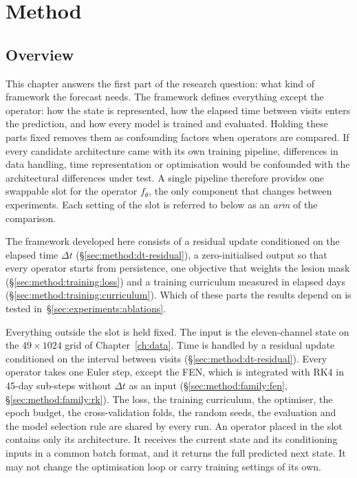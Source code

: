\cleardoubleoddpage%
\chapter{Method}
\label{ch:method}


\section{Overview}
\label{sec:method:overview}

This chapter answers the first part of the research question: what kind
of framework the forecast needs. The framework defines everything except
the operator: how the state is represented, how the elapsed time
between visits enters the prediction, and how every model is trained and
evaluated. Holding these parts fixed removes them as confounding factors
when operators are compared. If every candidate architecture came with its
own training pipeline, differences in data handling, time representation
or optimisation would be confounded with the architectural differences
under test. A single pipeline therefore provides one swappable slot for
the operator $f_\theta$, the only component that changes between
experiments. Each setting of the slot is referred to below as an
\emph{arm} of the comparison.

The framework developed here consists of a residual update conditioned
on the elapsed time $\Delta t$ (\S\ref{sec:method:dt-residual}), a
zero-initialised output so that every operator starts from persistence,
one objective that weights the lesion mask
(\S\ref{sec:method:training:loss}) and a training curriculum measured in
elapsed days (\S\ref{sec:method:training:curriculum}). Which of these
parts the results depend on is tested
in~\S\ref{sec:experiments:ablations}.

Everything outside the slot is held fixed. The input is the eleven-channel
state on the $49 \times 1024$ grid of Chapter~\ref{ch:data}. Time is
handled by a residual update conditioned on the interval between visits
(\S\ref{sec:method:dt-residual}). Every operator takes one Euler step,
except the FEN, which is integrated with RK4 in 45-day sub-steps without
$\Delta t$ as an input (\S\ref{sec:method:family:fen},
\S\ref{sec:method:family:rk}). The loss, the training
curriculum, the optimiser, the epoch budget, the cross-validation folds,
the random seeds, the evaluation and the model selection rule are shared
by every run. An operator placed in the slot contains only its
architecture. It receives the current state and its conditioning inputs in
a common batch format, and it returns the full predicted next state. It may
not change the optimisation loop or carry training settings of its own.

